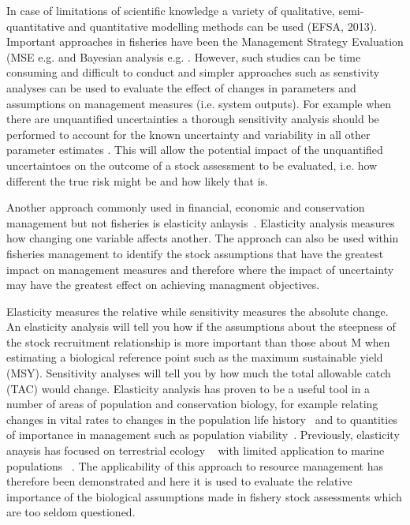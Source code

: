 \documentclass[preprint,authoryear,12pt]{elsarticle}
\begin{document}
In case of limitations of scientific knowledge  a variety of 
qualitative, semi-quantitative and quantitative modelling methods can be used (EFSA, 2013).
Important approaches in fisheries have been the  Management Strategy Evaluation (MSE e.g.  \citep{cooke1999improvement, 
mcallister2001using, kell2007flr, punt2007developing}  and Bayesian analysis e.g. \citep{haapasaari2010formalizing, uusitalo2007advantages, 
levontin2011integration, mcbride2012expert}. However, such studies can be time consuming and difficult to conduct and simpler approaches 
such as senstivity analyses can be used to evaluate the effect of changes in parameters and assumptions on management measures 
(i.e. system outputs). For example when there are unquantified uncertainties a thorough sensitivity analysis should be performed to account
for the known uncertainty and variability in all other parameter estimates \cite{hamby1994review}. This will allow the potential impact 
of the unquantified uncertaintoes on the outcome of a stock assessment to be evaluated, i.e. how different the true risk might be and how likely that is.

Another approach commonly used in financial, economic and conservation management but not fisheries is elasticity anlaysis~\cite{de1986elasticity}.
Elasticity analysis measures how changing one variable affects another. The approach can also be used within fisheries management to identify the stock assumptions 
that have the greatest impact on management measures and therefore where the impact of uncertainty may have the greatest effect on achieving managment objectives.

Elasticity measures the relative while sensitivity measures the absolute change. An elasticity analysis will tell you how if the assumptions about
the steepness of the stock recruitment relationship is more important than those about M when estimating a biological reference point such
as the maximum sustainable yield (MSY). Sensitivity analyses will tell you by how much the total allowable catch (TAC) would change.
Elasticity analysis has  proven to be a useful tool in a number of areas of population and conservation biology, for example relating changes in
vital rates to changes in the population life history~\cite{grant2003density} and to quantities of importance in management such as population
viability~\cite{heppell1998application}. Previously, elasticity anaysis has focused on terrestrial 
ecology ~\cite{Benton1999467, Hunter2000299, Pichancourt200631} with limited application to marine populations ~\cite{RogersBennett2006, Heppell2007}. 
The applicability of this approach to resource management has therefore been demonstrated and here it is used to evaluate the relative importance of
the biological assumptions made in fishery stock assessments which are too seldom questioned.
\end{document}
